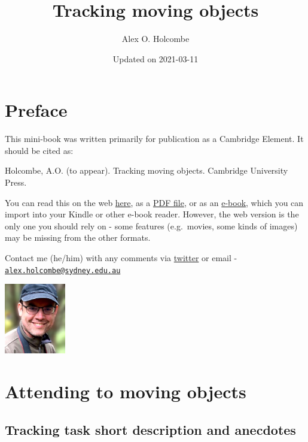\documentclass[]{book}
\title{Tracking moving objects}
\author{Alex O. Holcombe}
\date{Updated on 2021-03-11}
\begin{document}
\maketitle

{
\setcounter{tocdepth}{1}
\tableofcontents
}
\hypertarget{preface}{%
\chapter*{Preface}\label{preface}}

This mini-book was written primarily for publication as a Cambridge Element. It should be cited as:

Holcombe, A.O. (to appear). Tracking moving objects. Cambridge University Press.

You can read this on the web \href{https://tracking.whatanimalssee.com/index.html}{here}, as a \href{bookdown-demo.pdf}{PDF file}, or as an \href{bookdown-demo.epub}{e-book}, which you can import into your Kindle or other e-book reader. However, the web version is the only one you should rely on - some features (e.g.~movies, some kinds of images) may be missing from the other formats.

Contact me (he/him) with any comments via \href{https://twitter.com/ceptional}{twitter} or email - \href{mailto:alex.holcombe@sydney.edu.au}{\nolinkurl{alex.holcombe@sydney.edu.au}}

\includegraphics[width=0.2\textwidth,height=\textheight]{imagesForRmd/corellaOnShoulder2020croppedBlurredByAdobeOnline.jpg}

\hypertarget{attending-to-moving-objects}{%
\chapter{Attending to moving objects}\label{attending-to-moving-objects}}

\hypertarget{tracking-task-short-description-and-anecdotes}{%
\section{Tracking task short description and anecdotes}\label{tracking-task-short-description-and-anecdotes}}
\end{document}
